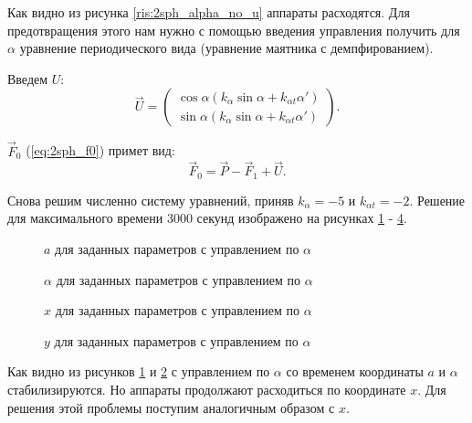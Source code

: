Как видно из рисунка \ref{ris:2sph_alpha_no_u} аппараты расходятся.
Для предотвращения этого нам нужно с помощью введения управления получить для $\alpha$ уравнение периодического вида (уравнение маятника с демпфированием).

Введем $U$:
\begin{equation}
\label{ris:2sph_U_alpha}
	\vec{U} = 
	\begin{pmatrix}
		\cos \alpha \left(k_\alpha \sin \alpha + k_{\alpha t}\alpha'\right)\\
		\sin \alpha \left(k_\alpha \sin \alpha + k_{\alpha t}\alpha'\right)
	\end{pmatrix}.
\end{equation}

$\vec{F}_0$ (\ref{eq:2sph_f0}) примет вид:
\begin{equation}
\label{eq:2sph_f0_u}
	\vec{F}_0 = \vec{P} - \vec{F}_1 + \vec{U}.
\end{equation}

Снова решим численно систему уравнений, приняв $k_\alpha = -5$ и $k_{\alpha t} = -2$.
Решение для максимального времени $3000$ секунд изображено на рисунках \ref{ris:2sph_a_alpha_u} - \ref{ris:2sph_y_alpha_u}.

\begin{figure}[H]
	\caption{$a$ для заданных параметров с управлением по $\alpha$}
	\label{ris:2sph_a_alpha_u}
\end{figure}
\begin{figure}[H]
	\caption{$\alpha$ для заданных параметров с управлением по $\alpha$}
	\label{ris:2sph_alpha_alpha_u}
\end{figure} 
\begin{figure}[H]
	\caption{$x$ для заданных параметров с управлением по $\alpha$}
	\label{ris:2sph_x_alpha_u}
\end{figure} 
\begin{figure}[H]
	\caption{$y$ для заданных параметров с управлением по $\alpha$}
	\label{ris:2sph_y_alpha_u}
\end{figure} 

Как видно из рисунков \ref{ris:2sph_a_alpha_u} и \ref{ris:2sph_alpha_alpha_u} с управлением по $\alpha$ со временем координаты $a$ и $\alpha$ стабилизируются.
Но аппараты продолжают расходиться по координате $x$.
Для решения этой проблемы поступим аналогичным образом с $x$.


